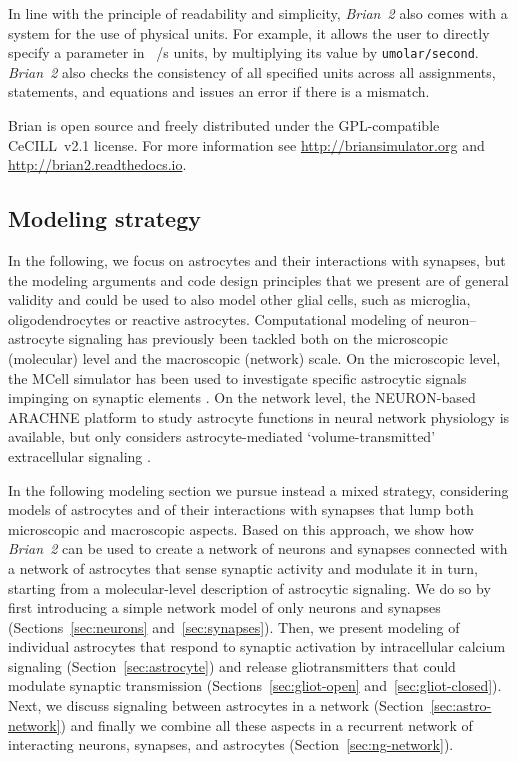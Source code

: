 \documentclass[a4paper, 11pt]{article}
\newcommand{\brian}{\emph{Brian~2}\xspace}
\newcommand*{\secref}[1]{Section~\ref{#1}}
\begin{document}
In line with the principle of readability and simplicity, \brian also comes with a system for the use of physical units. For example, it allows the user to directly specify a parameter in \si{\micro \Molar/s} units, by multiplying its value by \lstinline|umolar/second|.
\brian also checks the consistency of all specified units across all assignments, statements, and equations and issues an error if there is a mismatch.

Brian is open source and freely distributed under the GPL-compatible CeCILL~v2.1 license. For more information see \url{http://briansimulator.org} and \url{http://brian2.readthedocs.io}.

\subsection{Modeling strategy}
In the following, we focus on astrocytes and their interactions with synapses, but the modeling arguments and code design principles that we present are of general validity and could be used to also model other glial cells, such as microglia, oligodendrocytes or reactive astrocytes.
Computational modeling of neuron--astrocyte signaling has previously been tackled both on the microscopic (molecular) level and the macroscopic (network) scale.
On the microscopic level, the MCell simulator \citep{Stiles2001} has been used to investigate specific astrocytic signals impinging on synaptic elements \citep{Beenhakker_JN2010}.
On the network level, the NEURON-based ARACHNE platform to study astrocyte functions in neural network physiology is available, but only considers astrocyte-mediated `volume-transmitted' extracellular signaling \citep{Savtchenko_PTRSB2014,Aleksin_PCB2017}.

In the following modeling section we pursue instead a mixed strategy, considering models of astrocytes and of their interactions with synapses that lump both microscopic and macroscopic aspects.
Based on this approach, we show how \brian can be used to create a network of neurons and synapses connected with a network of astrocytes that sense synaptic activity and modulate it in turn, starting from a molecular-level description of astrocytic signaling.
We do so by first introducing a simple network model of only neurons and synapses (Sections~\ref{sec:neurons} and~\ref{sec:synapses}).
Then, we present modeling of individual astrocytes that respond to synaptic activation by intracellular calcium signaling (\secref{sec:astrocyte}) and release gliotransmitters that could modulate synaptic transmission (Sections~\ref{sec:gliot-open} and~\ref{sec:gliot-closed}).
Next, we discuss signaling between astrocytes in a network (\secref{sec:astro-network}) and finally we combine all these aspects in a recurrent network of interacting neurons, synapses, and astrocytes (\secref{sec:ng-network}).
\end{document}
